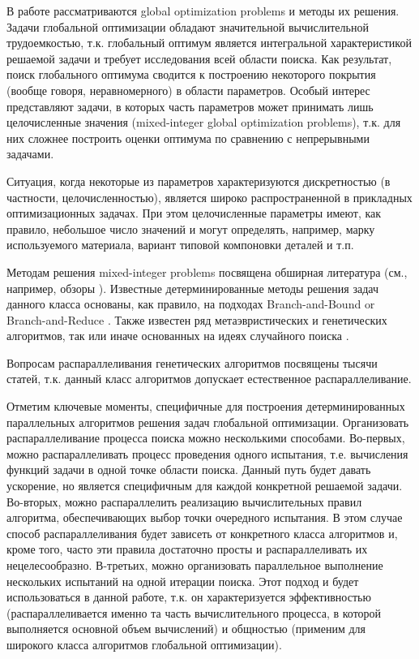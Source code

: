 \documentclass[
11pt,%
tightenlines,%
twoside,%
onecolumn,%
nofloats,%
nobibnotes,%
nofootinbib,%
superscriptaddress,%
noshowpacs,%
centertags]%
{revtex4}
\begin{document}
В работе рассматриваются global optimization problems и методы их решения. Задачи глобальной оптимизации обладают значительной вычислительной трудоемкостью, т.к. глобальный оптимум является интегральной характеристикой решаемой задачи и требует исследования всей области поиска. Как результат, поиск глобального оптимума сводится к построению некоторого покрытия (вообще говоря, неравномерного) в области параметров. Особый интерес представляют задачи, в которых часть параметров может принимать лишь целочисленные значения (mixed-integer global optimization problems), т.к. для них сложнее построить оценки оптимума по сравнению с непрерывными задачами.

Ситуация, когда некоторые из параметров характеризуются дискретностью (в частности, целочисленностью), является широко распространенной в прикладных оптимизационных задачах. При этом целочисленные параметры имеют, как правило, небольшое число значений и могут определять, например, марку используемого материала, вариант типовой компоновки деталей и т.п.

Методам решения mixed-integer problems посвящена обширная литература (см., например, обзоры \cite{Burer,Boukouvala}). Известные детерминированные методы решения задач данного класса основаны, как правило, на подходах Branch-and-Bound \cite{Belotti} or Branch-and-Reduce \cite{Vigerske}. Также известен ряд метаэвристических и генетических алгоритмов, так или иначе основанных на идеях случайного поиска \cite{Deep,Schluter}.

Вопросам распараллеливания генетических алгоритмов посвящены тысячи статей, т.к. данный класс алгоритмов допускает естественное распараллеливание. 


Отметим ключевые моменты, специфичные для построения детерминированных параллельных алгоритмов решения задач глобальной оптимизации. Организовать распараллеливание процесса поиска можно несколькими способами.
Во-первых, можно распараллеливать процесс проведения одного испытания, т.е. вычисления функций задачи в одной точке области поиска. Данный путь будет давать ускорение, но является специфичным для каждой конкретной решаемой задачи.
Во-вторых, можно распараллелить реализацию вычислительных правил алгоритма, обеспечивающих выбор точки очередного испытания. В этом случае способ распараллеливания будет зависеть от конкретного класса алгоритмов и, кроме того, часто эти правила достаточно просты и распараллеливать их нецелесообразно.
В-третьих, можно организовать параллельное выполнение нескольких испытаний на одной итерации поиска. Этот подход и будет использоваться в данной работе, т.к. он характеризуется эффективностью (распараллеливается именно та часть вычислительного процесса, в которой выполняется основной объем вычислений) и общностью (применим для широкого класса алгоритмов глобальной оптимизации).
\end{document}
